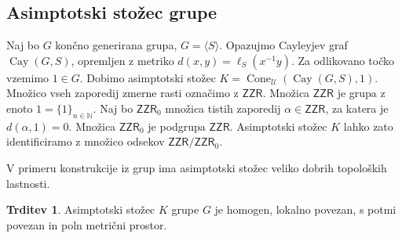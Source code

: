 \documentclass[11pt]{book}
\def\NN{\mathbb{N}}
\def\UU{\mathcal{U}}
\def\ZR{\mathsf{ZZR}}
\DeclareMathOperator\Cay{Cay}
\DeclareMathOperator\Cone{Cone}
\theoremstyle{definition}
\theoremstyle{zgled}
\theoremstyle{odprtproblem}
\theoremstyle{domacanaloga}
\theoremstyle{izrek}
\newtheorem*{trditev}{Trditev}
\begin{document}
\subsection{Asimptotski stožec grupe}

Naj bo $G$ končno generirana grupa, $G = \langle S \rangle$. Opazujmo Cayleyjev graf $\Cay(G,S)$, opremljen z metriko $d(x,y) = \ell_S(x^{-1} y)$. Za odlikovano točko vzemimo $1 \in G$. Dobimo asimptotski stožec $K = \Cone_\UU(\Cay(G,S), 1)$. Množico vseh zaporedij zmerne rasti označimo z $\ZR$. Množica $\ZR$ je grupa z enoto $1 = \{ 1 \}_{n \in \NN}$. Naj bo $\ZR_0$ množica tistih zaporedij $\alpha \in \ZR$, za katera je $d(\alpha, 1) = 0$. Množica $\ZR_0$ je podgrupa $\ZR$. Asimptotski stožec $K$ lahko zato identificiramo z množico odsekov $\ZR/\ZR_0$.

V primeru konstrukcije iz grup ima asimptotski stožec veliko dobrih topoloških lastnosti.

\begin{trditev}
Asimptotski stožec $K$ grupe $G$ je homogen, lokalno povezan, s potmi povezan in poln metrični prostor.
\end{trditev}
\end{document}
